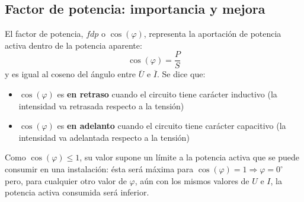 	
\subsection{Factor de potencia: importancia y
  mejora}\label{sec:mejora_fdp_monofasica}
	
El factor de potencia, $fdp$ o $\cos(\varphi)$, representa la
aportación de potencia activa dentro de la potencia aparente:
\begin{equation}
  \boxed{\cos(\varphi)=\dfrac{P}{S}}
\end{equation}
y es igual al coseno del ángulo entre $\overline{U}$ e
$\overline{I}$. Se dice que:
\begin{itemize}
\item $\cos(\varphi)$ es \textbf{en retraso} cuando el circuito tiene
  carácter inductivo (la intensidad va retrasada respecto a la
  tensión)
\item $\cos(\varphi)$ es \textbf{en adelanto} cuando el circuito tiene
  carácter capacitivo (la intensidad va adelantada respecto a la
  tensión)
\end{itemize}
\begin{remark}
  Como $\cos(\varphi)\leq 1$, su valor supone un límite a la potencia
  activa que se puede consumir en una instalación: ésta será máxima
  para $\cos(\varphi)=1\Rightarrow \varphi=0^\circ$ pero, para cualquier
  otro valor de $\varphi$, aún con los mismos valores de $U$ e $I$, la
  potencia activa consumida será inferior.
\end{remark}
	
